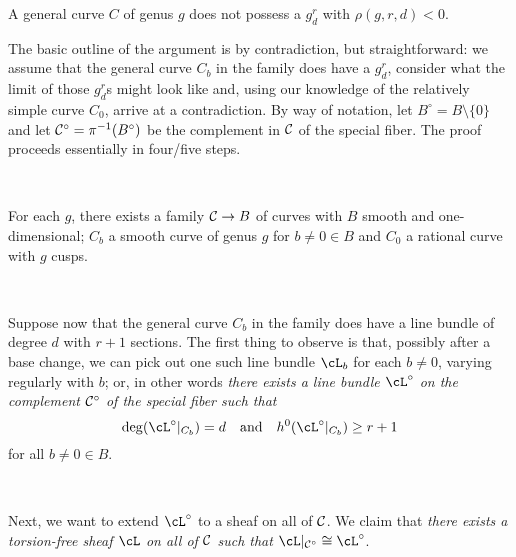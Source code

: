 \begin{theorem}\label{bare-bones BN}
A general curve $C$ of genus $g$ does not possess a $g^r_d$ with $\rho(g,r,d) < 0$.
\end{theorem}


The basic outline of the argument is by contradiction, but straightforward: we assume that the general curve $C_b$ in the family does have a $g^r_d$, consider what the limit of those $g^r_d$s might look like and, using our knowledge of the relatively simple curve $C_0$, arrive at a contradiction. By way of notation, let $B^\circ = B \setminus \{0\}$ and let $\cC^\circ = \pi^{-1}(B^\circ)$ be the complement in $\cC$ of the special fiber. The proof proceeds essentially in four/five steps.

\


\begin{lemma}\label{cusp smoothing lemma}
For each $g$, there exists a family $\cC \to B$ of curves with $B$ smooth and one-dimensional; $C_b$ a smooth curve of genus $g$ for $b \neq 0 \in B$ and $C_0$ a rational curve with $g$ cusps.
\end{lemma}

\


Suppose now that the general curve $C_b$ in the family does have a line bundle  of degree $d$ with $r+1$ sections. The first thing to observe is that, possibly after a base change, we can pick out one such line bundle $\cL_b$ for each $b \neq 0$, varying regularly with $b$; or, in other words \emph{there exists a  line bundle $\cL^\circ$ on the complement $\cC^\circ$ of the special fiber such that}
$$
\deg(\cL^\circ|_{C_b}) = d \quad \text{and} \quad h^0(\cL^\circ|_{C_b}) \geq r+1
$$
for all $b \neq 0 \in B$. 

\


Next, we want to extend $\cL^\circ$ to a sheaf on all of $\cC$. We claim that \emph{there exists a torsion-free sheaf $\cL$ on all of $\cC$ such that $\cL|_{\cC^\circ} \cong \cL^\circ$}.

